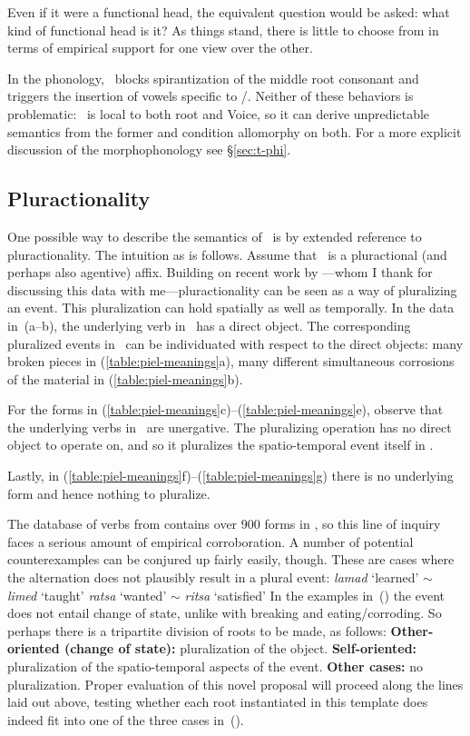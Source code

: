 Even if it were a functional head, the equivalent question would be asked: what kind of functional head is it? As things stand, there is little to choose from in terms of empirical support for one view over the other.

In the phonology, \va~blocks spirantization of the middle root consonant and triggers the insertion of vowels specific to \tpie/\thit. Neither of these behaviors is problematic: \va~is local to both root and Voice, so it can derive unpredictable semantics from the former and condition allomorphy on both. For a more explicit discussion of the morphophonology see \S\ref{sec:t-phi}.



	\subsection{Pluractionality} \label{voice:va:plural}
One possible way to describe the semantics of \va~is by extended reference to pluractionality. The intuition as is follows. Assume that \va~is a pluractional (and perhaps also agentive) affix. Building on recent work by \cite{henderson12phd,henderson16nllt}---whom I thank for discussing this data with me---pluractionality can be seen as a way of pluralizing an event. This pluralization can hold spatially as well as temporally. In the data in~(\lastx a--b), the underlying verb in \tkal~has a direct object. The corresponding pluralized events in \tpie~can be individuated with respect to the direct objects: many broken pieces in (\ref{table:piel-meanings}a), many different simultaneous corrosions of the material in (\ref{table:piel-meanings}b).

For the forms in (\ref{table:piel-meanings}c)--(\ref{table:piel-meanings}e), observe that the underlying verbs in \tkal~are unergative. The pluralizing operation has no direct object to operate on, and so it pluralizes the spatio-temporal event itself in \tpie.

Lastly, in (\ref{table:piel-meanings}f)--(\ref{table:piel-meanings}g) there is no underlying form and hence nothing to pluralize.

The database of verbs from \cite{ehrenfeld12} contains over 900 forms in \tpie, so this line of inquiry faces a serious amount of empirical corroboration. A number of potential counterexamples can be conjured up fairly easily, though. These are cases where the alternation does not plausibly result in a plural event:
\pex
	\a \emph{lamad} `learned' $\sim$ \emph{limed} `taught'
	\a \emph{ratsa} `wanted' $\sim$ \emph{ritsa} `satisfied'
\xe
In the examples in~(\lastx) the event does not entail change of state, unlike with breaking and eating/corroding. So perhaps there is a tripartite division of roots to be made, as follows:
\pex
	\a \textbf{Other-oriented (change of state):} pluralization of the object.
	\a \textbf{Self-oriented:} pluralization of the spatio-temporal aspects of the event.
	\a \textbf{Other cases:} no pluralization.
\xe
Proper evaluation of this novel proposal will proceed along the lines laid out above, testing whether each root instantiated in this template does indeed fit into one of the three cases in~(\lastx).

